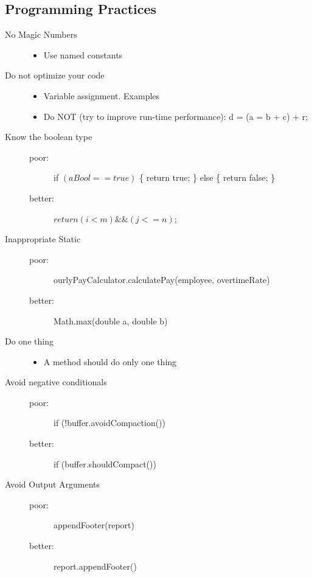 \documentclass[a4paper,10pt]{article}
\begin{document}
\subsection{Programming Practices}
\begin{description}
	\item[No  Magic Numbers] \hfill
		\begin{itemize}
			\item Use named constants
		\end{itemize}
	\item[Do not optimize your code] \hfill 
		\begin{itemize}
			\item Variable assignment. Examples
			\item Do NOT (try to improve run-time performance): d = (a = b + c) + r;
		\end{itemize}
	\item[Know the boolean type] \hfill
		\begin{description}
			\item[poor:] if $(aBool == true)$ \{ return true; \} else \{ return false; \}
			\item[better:] $return (i < m) \&\& (j <= n);$
		\end{description}
	\item[Inappropriate Static] \hfill
		\begin{description}
			\item[poor:] ourlyPayCalculator.calculatePay(employee, overtimeRate)
			\item[better:] Math.max(double a, double b)
		\end{description}
	\item[Do one thing] \hfill
		\begin{itemize}
			\item A method should do only one thing
		\end{itemize}
	\item[Avoid negative conditionals] \hfill
		\begin{description}
			\item[poor:] if (!buffer.avoidCompaction())
			\item[better:] if (buffer.shouldCompact())
		\end{description}
	\item[Avoid Output Arguments] \hfill
		\begin{description}
			\item[poor:] appendFooter(report)
			\item[better:] report.appendFooter()
		\end{description}
\end{description}
\end{document}
